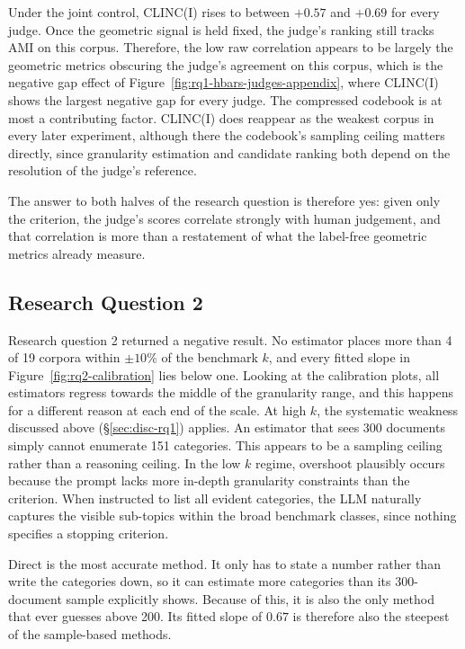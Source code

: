 \documentclass[11pt,a4paper,oneside]{report}
\begin{document}
Under the joint control, CLINC(I) rises to between $+0.57$
and $+0.69$ for every judge. Once the geometric signal is held fixed, the
judge's ranking still tracks AMI on this corpus. Therefore, the low raw correlation appears to be largely the geometric metrics obscuring the judge's agreement on this corpus, which is the negative gap effect of Figure~\ref{fig:rq1-hbars-judges-appendix}, where CLINC(I) shows the largest negative gap for every judge. The compressed codebook is at most a contributing factor. CLINC(I) does reappear
as the weakest corpus in every later experiment, although there the codebook's sampling ceiling matters directly, since granularity estimation and candidate ranking both depend on the resolution of the judge's reference.

The answer to both halves of the research question is therefore yes:
given only the criterion, the judge's scores correlate strongly with
human judgement, and that correlation is more than a restatement of what
the label-free geometric metrics already measure.

\subsection{Research Question 2}

Research question 2 returned a negative result. No estimator places more than 4 of 19 corpora within $\pm 10\%$ of the benchmark $k$, and every fitted slope in Figure~\ref{fig:rq2-calibration} lies below one. Looking at the calibration plots, all estimators regress towards the middle of the granularity range, and this happens for a different reason at each end of the scale. At high $k$, the systematic weakness discussed above (\S\ref{sec:disc-rq1}) applies. An estimator that sees 300 documents simply cannot enumerate 151 categories. This appears to be a sampling ceiling rather than a reasoning ceiling. In the low $k$ regime, overshoot plausibly occurs because the prompt lacks more in-depth granularity constraints than the criterion. When instructed to list all evident categories, the LLM naturally captures the visible sub-topics within the broad benchmark classes, since nothing specifies a stopping criterion.

Direct is the most accurate method. It only has to state a number rather than write the categories down, so it can estimate more categories than its 300-document
sample explicitly shows. Because of this, it is also the only method that ever guesses above 200. Its fitted slope of $0.67$ is therefore also the steepest of the sample-based methods. 
\end{document}
